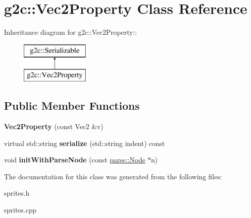 \hypertarget{classg2c_1_1_vec2_property}{
\section{g2c::Vec2Property Class Reference}
\label{classg2c_1_1_vec2_property}
}
Inheritance diagram for g2c::Vec2Property::\begin{figure}[H]
\begin{center}
\leavevmode
\includegraphics[height=2cm]{classg2c_1_1_vec2_property}
\end{center}
\end{figure}
\subsection*{Public Member Functions}
\begin{DoxyCompactItemize}
\item 
\hypertarget{classg2c_1_1_vec2_property_af9deb0e1b63b3da4cc626b5143d84706}{
{\bfseries Vec2Property} (const Vec2 \&v)}
\label{classg2c_1_1_vec2_property_af9deb0e1b63b3da4cc626b5143d84706}

\item 
\hypertarget{classg2c_1_1_vec2_property_ade5f28ec67ffc3503769666812ba43e0}{
virtual std::string {\bfseries serialize} (std::string indent) const }
\label{classg2c_1_1_vec2_property_ade5f28ec67ffc3503769666812ba43e0}

\item 
\hypertarget{classg2c_1_1_vec2_property_a7b767b039d126a1029ebb60438618e8f}{
void {\bfseries initWithParseNode} (const \hyperlink{classparse_1_1_node}{parse::Node} $\ast$n)}
\label{classg2c_1_1_vec2_property_a7b767b039d126a1029ebb60438618e8f}

\end{DoxyCompactItemize}


The documentation for this class was generated from the following files:\begin{DoxyCompactItemize}
\item 
sprites.h\item 
sprites.cpp\end{DoxyCompactItemize}
